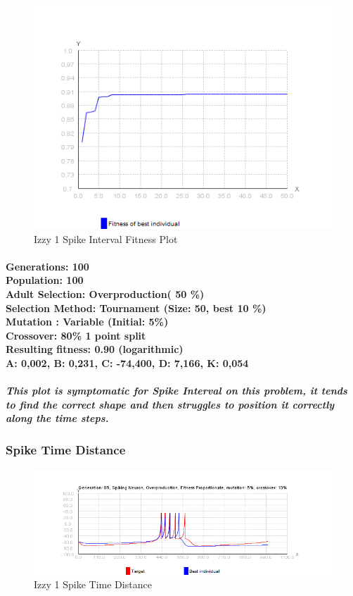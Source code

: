 \documentclass[titlepage,norsk]{article}
\begin{document}
\begin{figure}[h!]
\centering
\includegraphics[scale=0.75]{izzy1intervalFitness.png}
\caption{Izzy 1 Spike Interval Fitness Plot}
\label{fig:awesome_image}
\end{figure}

\paragraph{
Generations: 100\\
Population: 100\\
Adult Selection: Overproduction( 50 \%)\\
Selection Method: Tournament (Size: 50, best 10 \%) \\
Mutation : Variable (Initial: 5\%)\\
Crossover: 80\% 1 point split \\
Resulting fitness: 0.90 (logarithmic) \\
 A: 0,002, B: 0,231, C: -74,400, D: 7,166, K: 0,054 \\
}

\subparagraph{This plot is symptomatic for Spike Interval on this problem, it tends to find the correct shape and then struggles to position it correctly along the time steps.}

\subsubsection{Spike Time  Distance}

\begin{figure}[h!]
\centering
\includegraphics[scale=0.75]{izzy1spike.png}
\caption{Izzy 1 Spike Time Distance}
\label{fig:awesome_image}
\end{figure}
\end{document}
